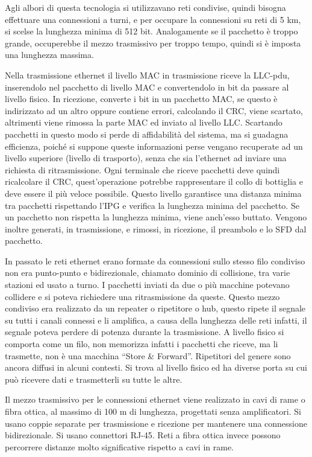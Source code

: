 \documentclass{article}
\numberwithin{equation}{subsection}
\begin{document}
Agli albori di questa tecnologia si utilizzavano reti condivise, quindi bisogna effettuare una connessioni a turni, e per occupare la connessioni su reti di 5 km, si scelse la lunghezza minima di 512 bit. 
Analogamente se il pacchetto è troppo grande, occuperebbe il mezzo trasmissivo per troppo tempo, quindi si è imposta una lunghezza massima. 


Nella trasmissione ethernet il livello MAC in trasmissione riceve la LLC-pdu, inserendolo nel pacchetto di livello MAC e convertendolo in bit da passare al livello fisico. In ricezione, converte i bit in un pacchetto 
MAC, se questo è indirizzato ad un altro oppure contiene errori, calcolando il CRC, viene scartato, altrimenti viene rimossa la parte MAC ed inviato al livello LLC. 
Scartando pacchetti in questo modo si perde di affidabilità del sistema, ma si guadagna efficienza, poiché si suppone queste informazioni perse vengano recuperate ad un livello superiore (livello di trasporto), 
senza che sia l'ethernet ad inviare una richiesta di ritrasmissione. Ogni terminale che riceve pacchetti deve quindi ricalcolare il CRC, quest'operazione potrebbe rappresentare il collo di bottiglia e deve essere il 
più veloce possibile. Questo livello garantisce una distanza minima tra pacchetti rispettando l'IPG e verifica la lunghezza minima del pacchetto. Se un pacchetto non rispetta la lunghezza minima, viene anch'esso 
buttato. Vengono inoltre generati, in trasmissione, e rimossi, in ricezione, il preambolo e lo SFD dal pacchetto. 



In passato le reti ethernet erano formate da connessioni sullo stesso filo condiviso non era punto-punto e bidirezionale, chiamato dominio di collisione, tra varie stazioni ed usato a turno. I pacchetti inviati 
da due o più macchine potevano collidere e si poteva richiedere una ritrasmissione da queste. Questo mezzo condiviso era realizzato da un repeater o ripetitore o hub, questo ripete il segnale su tutti i canali connessi e li 
amplifica, a causa della lunghezza delle reti infatti, il segnale poteva perdere di potenza durante la trasmissione. A livello fisico si comporta come un filo, non memorizza infatti i pacchetti che riceve, 
ma li trasmette, non è una macchina ``Store \& Forward''. Ripetitori del genere sono ancora diffusi in alcuni contesti. 
Si trova al livello fisico ed ha diverse porta su cui può ricevere dati e trasmetterli su tutte le altre. 



Il mezzo trasmissivo per le connessioni ethernet viene realizzato in cavi di rame o fibra ottica, al massimo di 100 m di lunghezza, progettati senza amplificatori. Si usano coppie separate per trasmissione e 
ricezione per mantenere una connessione bidirezionale. Si usano connettori RJ-45. Reti a fibra ottica invece possono percorrere distanze molto significative rispetto a cavi in rame. 
\end{document}

